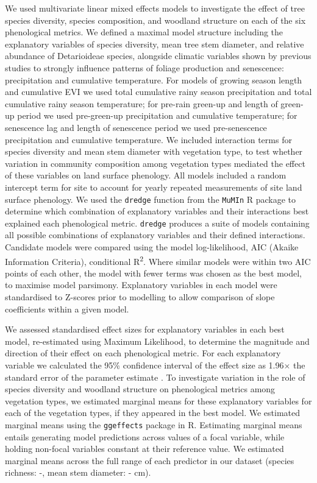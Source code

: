 \documentclass[11pt,a4paper]{article}
\begin{document}
We used multivariate linear mixed effects models to investigate the effect of
tree species diversity, species composition, and woodland structure on each of
the six phenological metrics. We defined a maximal model structure including
the explanatory variables of species diversity, mean tree stem diameter, and
relative abundance of Detarioideae species, alongside climatic variables shown
by previous studies to strongly influence patterns of foliage production and
senescence: precipitation and cumulative temperature. For models of growing
season length and cumulative EVI we used total cumulative rainy season
precipitation and total cumulative rainy season temperature; for pre-rain
green-up and length of green-up period we used pre-green-up precipitation and
cumulative temperature; for senescence lag and length of senescence period we
used pre-senescence precipitation and cumulative temperature. We included
interaction terms for species diversity and mean stem diameter with vegetation
type, to test whether variation in community composition among vegetation types
mediated the effect of these variables on land surface phenology. All models
included a random intercept term for site to account for yearly repeated
measurements of site land surface phenology. We used the \texttt{dredge}
function from the \texttt{MuMIn} R package to determine which combination of
explanatory variables and their interactions best explained each phenological
metric. \texttt{dredge} produces a suite of models containing all possible
combinations of explanatory variables and their defined interactions. Candidate
models were compared using the model log-likelihood, AIC (Akaike Information
Criteria), conditional R\textsuperscript{2}. Where similar models were within
two AIC points of each other, the model with fewer terms was chosen as the best
model, to maximise model parsimony. Explanatory variables in each model were
standardised to Z-scores prior to modelling to allow comparison of slope
coefficients within a given model.

We assessed standardised effect sizes for explanatory variables in each best
model, re-estimated using Maximum Likelihood, to determine the magnitude and
direction of their effect on each phenological metric. For each explanatory
variable we calculated the 95\% confidence interval of the effect size as
1.96$\times{}$ the standard error of the parameter estimate \citep{Zuur2010}.
To investigate variation in the role of species diversity and woodland
structure on phenological metrics among vegetation types, we estimated marginal
means for these explanatory variables for each of the vegetation types, if they
appeared in the best model. We estimated marginal means using the
\texttt{ggeffects} package in R. Estimating marginal means entails generating
model predictions across values of a focal variable, while holding non-focal
variables constant at their reference value. We estimated marginal means across
the full range of each predictor in our dataset (species richness:
\richPredMin{}-\richPredMax{}, mean stem diameter: \dqmPredMin{}-\dqmPredMax{}
cm).
\end{document}
